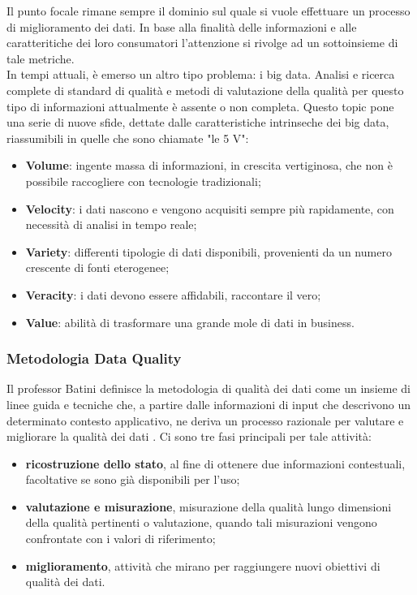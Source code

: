 \documentclass[a4paper,12pt]{article}
\begin{document}
\noindent Il punto focale rimane sempre il dominio sul quale si vuole effettuare un processo di miglioramento dei dati. In base alla finalità delle informazioni e alle caratteritiche dei loro consumatori l'attenzione si rivolge ad un sottoinsieme di tale metriche.\\
In tempi attuali, è emerso un altro tipo problema: i big data. Analisi e ricerca complete di standard di qualità e metodi di valutazione della qualità per questo tipo di informazioni attualmente è assente o non completa. Questo topic pone una serie di nuove sfide, dettate dalle caratteristiche intrinseche dei big data, riassumibili in quelle che sono chiamate "le 5 V":
\begin{itemize}
	\item \textbf{Volume}: ingente massa di informazioni, in crescita vertiginosa, che non è possibile raccogliere con tecnologie tradizionali;
	\item \textbf{Velocity}: i dati nascono e vengono acquisiti sempre più rapidamente, con necessità di analisi in tempo reale;
	\item \textbf{Variety}: differenti tipologie di dati disponibili, provenienti da un numero crescente di fonti eterogenee;
	\item \textbf{Veracity}: i dati devono essere affidabili, raccontare il vero;
	\item \textbf{Value}: abilità di trasformare una grande mole di dati in business.
\end{itemize}

\subsubsection{Metodologia Data Quality}

Il professor Batini definisce la metodologia di qualità dei dati come un insieme di linee guida e tecniche che, a partire dalle informazioni di input che descrivono un determinato contesto applicativo, ne deriva un processo razionale per valutare e migliorare la qualità dei dati \cite{10.1145/1541880.1541883}. Ci sono tre fasi principali per tale attività:
\begin{itemize}
\item \textbf{ricostruzione dello stato}, al fine di ottenere due informazioni contestuali, facoltative se sono già disponibili per l'uso;
\item \textbf{valutazione e misurazione}, misurazione della qualità lungo dimensioni della qualità pertinenti o valutazione, quando tali misurazioni vengono confrontate con i valori di riferimento;
\item \textbf{miglioramento}, attività che mirano per raggiungere nuovi obiettivi di qualità dei dati.
\end{itemize}
\end{document}
